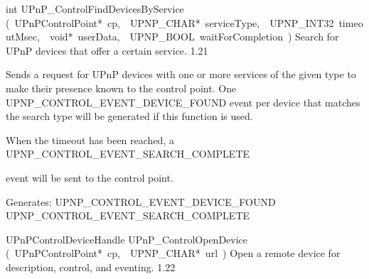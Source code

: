 \documentclass{article}
\begin{document}
\begin{cxxentry}
\begin{cxxfunction}
\begin{cxxdoc}
\end{cxxdoc}
\end{cxxfunction}
\begin{cxxfunction}
{int}
        {UPnP\_ControlFindDevicesByService}
        {(\ UPnPControlPoint*\ cp,\ \ UPNP\_CHAR*\ serviceType,\ \ UPNP\_INT32\ timeoutMsec,\ \ void*\ userData,\ \ UPNP\_BOOL\ waitForCompletion\ )}
        {Search for UPnP devices that offer a certain service. }
        {1.21}
\begin{cxxdoc}

Sends a request for UPnP devices with one or more services of the given
type to make their  presence known to the control point.  One
UPNP\_CONTROL\_EVENT\_DEVICE\_FOUND event per device that matches the
search type will be generated if this function is used.

When the timeout has been reached, a UPNP\_CONTROL\_EVENT\_SEARCH\_COMPLETE

event will be sent to the control point.

Generates:
UPNP\_CONTROL\_EVENT\_DEVICE\_FOUND
UPNP\_CONTROL\_EVENT\_SEARCH\_COMPLETE


\end{cxxdoc}
\end{cxxfunction}
\begin{cxxfunction}
{UPnPControlDeviceHandle}
        {UPnP\_ControlOpenDevice}
        {(\ UPnPControlPoint*\ cp,\ \ UPNP\_CHAR*\ url\ )}
        {Open a remote device for description, control, and eventing. }
        {1.22}
\begin{cxxdoc}


\end{cxxdoc}
\end{cxxfunction}
\end{cxxentry}
\end{document}
